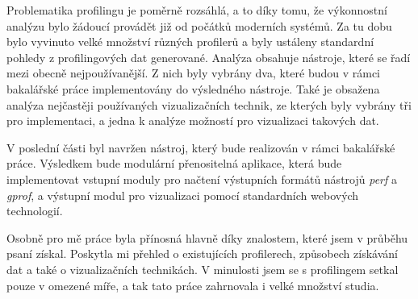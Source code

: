 \documentclass[czech,BP]{thesiskiv}
\begin{document}
Problematika profilingu je poměrně rozsáhlá, a to díky tomu, že výkonnostní analýzu bylo žádoucí provádět již od počátků moderních systémů. Za tu dobu bylo vyvinuto velké množství různých profilerů a byly ustáleny standardní pohledy z profilingových dat generované. Analýza obsahuje nástroje, které se řadí mezi obecně nejpoužívanější. Z nich byly vybrány dva, které budou v rámci bakalářské práce implementovány do výsledného nástroje. Také je obsažena analýza nejčastěji používaných vizualizačních technik, ze kterých byly vybrány tři pro implementaci, a jedna k analýze možností pro vizualizaci takových dat.

V poslední části byl navržen nástroj, který bude realizován v rámci bakalářské práce. Výsledkem bude modulární přenositelná aplikace, která bude implementovat vstupní moduly pro načtení výstupních formátů nástrojů \emph{perf} a \emph{gprof}, a výstupní modul pro vizualizaci pomocí standardních webových technologií.

Osobně pro mě práce byla přínosná hlavně díky znalostem, které jsem v průběhu psaní získal. Poskytla mi přehled o existujících profilerech, způsobech získávání dat a také o vizualizačních technikách. V minulosti jsem se s profilingem setkal pouze v omezené míře, a tak tato práce zahrnovala i velké množství studia.



\newpage










\newenvironment{seznamzkratek}[1]%
  {%
    \chapter*{Seznam zkratek}
    \addcontentsline{toc}{chapter}{Seznam zkratek}
    \begin{acronym}[#1]
  }{%
    \end{acronym}
    \newpage
  }%
\newcommand{\novazkratka}[3]%
  {\acro{#1}[#2]{#3}}
\newcommand{\zkratka}[1]%
  {\ac{#1}}
\newcommand{\zk}[1]%
  {\acs{#1}}
\newcommand{\zkratkatext}[1]%
  {\acl{#1}}
\end{document}
